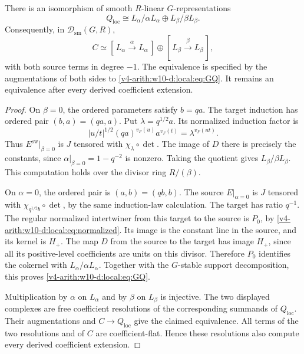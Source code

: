 \begin{theorem}\label{v4-arith:w10-d:local:thm:representation}
There is an isomorphism of smooth $R$-linear $G$-representations
\begin{equation}\label{v4-arith:w10-d:local:eq:GQ}
 Q_{\mathrm{loc}}\cong L_\alpha/\alpha L_\alpha
       \oplus L_\beta/\beta L_\beta.
\end{equation}
Consequently, in $\mathcal D_{\mathrm{sm}}(G,R)$,
\begin{equation}\label{v4-arith:w10-d:local:eq:koszul}
 C\simeq
 [\,L_\alpha\xrightarrow{\alpha}L_\alpha\,]
 \oplus
 [\,L_\beta\xrightarrow{\beta}L_\beta\,],
\end{equation}
with both source terms in degree $-1$.
The equivalence is specified by the augmentations of both sides to \eqref{v4-arith:w10-d:local:eq:GQ}.
It remains an equivalence after every derived coefficient extension.
\end{theorem}
\begin{proof}
On $\beta=0$, the ordered parameters satisfy $b=qa$.
The target induction has ordered pair $(b,a)=(qa,a)$.
Put $\lambda=q^{1/2}a$.
Its normalized induction factor is
\[
 |u/t|^{1/2}(qa)^{v_F(u)}a^{v_F(t)}
   =\lambda^{v_F(ut)}.
\]
Thus $E^\mathrm{sw}|_{\beta=0}$ is $J$ tensored with $\chi_\lambda\circ\det$.
The image of $D$ there is precisely the constants, since
$\alpha|_{\beta=0}=1-q^{-2}$ is nonzero.
Taking the quotient gives $L_\beta/\beta L_\beta$.
This computation holds over the divisor ring $R/(\beta)$.

On $\alpha=0$, the ordered pair is $(a,b)=(qb,b)$.
The source $E|_{\alpha=0}$ is $J$ tensored with
$\chi_{q^{1/2}b}\circ\det$, by the same induction-law calculation.
The target has ratio $q^{-1}$.
The regular normalized intertwiner from this target to the source is $P_0$,
by \eqref{v4-arith:w10-d:local:eq:normalized}.
Its image is the constant line in the source, and its kernel is $H_+$.
The map $D$ from the source to the target has image $H_+$,
since all its positive-level coefficients are units on this divisor.
Therefore $P_0$ identifies the cokernel with $L_\alpha/\alpha L_\alpha$.
Together with the $G$-stable support decomposition, this proves \eqref{v4-arith:w10-d:local:eq:GQ}.

Multiplication by $\alpha$ on $L_\alpha$ and by $\beta$ on $L_\beta$ is injective.
The two displayed complexes are free coefficient resolutions of the corresponding summands of $Q_{\mathrm{loc}}$.
Their augmentations and $C\to Q_{\mathrm{loc}}$ give the claimed equivalence.
All terms of the two resolutions and of $C$ are coefficient-flat.
Hence these resolutions also compute every derived coefficient extension.
\end{proof}


